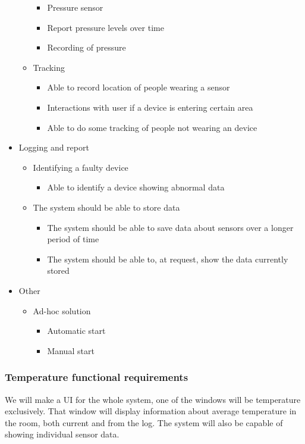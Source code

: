 \documentclass[../document]{subfiles}
\begin{document}
\begin{itemize}
\begin{itemize}
\begin{itemize}
			\item
			Pressure sensor
			\item
			Report pressure levels over time
			\item
			Recording of pressure
		\end{itemize}
		\item
		Tracking
		\begin{itemize}
			\item
			Able to record location of people wearing a sensor
			\item
			Interactions with user if a device is entering certain area
			\item
			Able to do some tracking of people not wearing an device
		\end{itemize}
	\end{itemize}
	\item
	Logging and report
	\begin{itemize}
		\item
		Identifying a faulty device
		\begin{itemize}
			\item
			Able to identify a device showing abnormal data
		\end{itemize}
		\item
		The system should be able to store data
		\begin{itemize}
			\item
			The system should be able to save data about sensors over a longer period of time
			\item
			The system should be able to, at request, show the data currently stored
		\end{itemize}
	\end{itemize}
	\item
	Other
	\begin{itemize}
		\item
		Ad-hoc solution
		\begin{itemize}
			\item
			Automatic start
			\item
			Manual start
		\end{itemize}
	\end{itemize}
\end{itemize}

\subsubsection{Temperature functional requirements}
We will make a UI for the whole system, one of the windows will be temperature exclusively. That window will display information about average temperature in the room, both current and from the log. The system will also be capable of showing individual sensor data.
\end{document}
